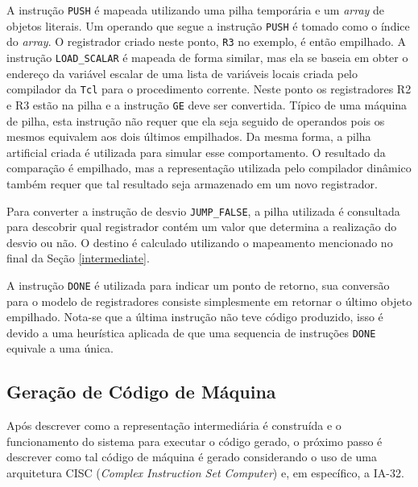 A instrução \verb!PUSH! é mapeada utilizando uma pilha temporária e
um \textit{array} de objetos literais. Um operando que segue a
instrução \verb!PUSH! é tomado como o índice do \textit{array}.
O registrador criado neste ponto,
\verb!R3! no exemplo, é então empilhado. A instrução \verb!LOAD_SCALAR!
é mapeada de forma similar, mas ela se baseia em obter o
endereço da variável escalar de uma lista de variáveis locais
criada pelo compilador da \texttt{Tcl} para o procedimento
corrente. Neste ponto os registradores R2 e R3 estão na pilha e
a instrução \verb!GE! deve ser convertida. Típico de uma máquina de
pilha, esta instrução não requer que ela seja seguido de operandos
pois os mesmos equivalem aos dois últimos empilhados. Da mesma forma,
a pilha artificial criada é utilizada para simular esse comportamento.
O resultado da comparação é empilhado, mas a representação utilizada
pelo compilador dinâmico também requer que tal resultado seja
armazenado em um novo registrador.

Para converter a instrução de desvio \verb!JUMP_FALSE!, a pilha
utilizada é consultada para descobrir qual registrador contém um valor
que determina a realização do desvio ou não. O destino é calculado
utilizando o mapeamento mencionado no final da Seção \ref{intermediate}.

A instrução \verb!DONE! é utilizada para indicar um ponto de
retorno, sua conversão para o modelo de registradores consiste
simplesmente em retornar o último objeto empilhado. Nota-se que a
última instrução
não teve código produzido, isso é devido a uma heurística aplicada de
que uma sequencia de instruções \verb!DONE! equivale a uma única.

\subsection{Geração de Código de Máquina}
\label{codegen}
Após descrever como a representação intermediária é construída e
o funcionamento do sistema para
executar o código gerado, o próximo passo é descrever como tal
código de máquina é gerado considerando o uso de uma arquitetura CISC
(\textit{Complex Instruction Set Computer}) e, em específico, a
IA-32\cite{intel_basicarch}.

